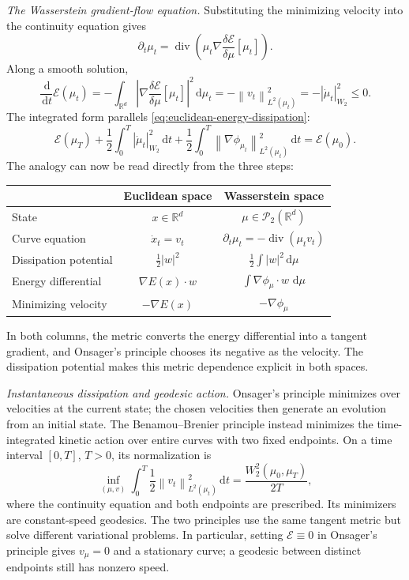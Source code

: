 \documentclass[11pt]{amsart}
\numberwithin{equation}{section}
\theoremstyle{plain}
\newcommand{\R}{\mathbb{R}}
\newcommand{\cP}{\mathcal{P}}
\newcommand{\dd}{\,\mathrm{d}}
\newcommand{\abs}[1]{\left\lvert#1\right\rvert}
\newcommand{\norm}[1]{\left\lVert#1\right\rVert}
\DeclareMathOperator{\diver}{div}
\begin{document}
\emph{The Wasserstein gradient-flow equation.}
Substituting the minimizing velocity into the continuity equation gives
\begin{equation}\label{eq:kinetic-role-gradient-flow}
 \partial_t\mu_t
 =\diver\left(
   \mu_t\nabla\frac{\delta\mathcal E}{\delta\mu}[\mu_t]\right).
\end{equation}
Along a smooth solution,
\begin{equation}\label{eq:wasserstein-energy-dissipation}
 \frac{\dd}{\dd t}\mathcal E(\mu_t)
 =-\int_{\R^d}
   \left|\nabla\frac{\delta\mathcal E}{\delta\mu}[\mu_t]\right|^2
   \dd\mu_t
 =-\norm{v_t}_{L^2(\mu_t)}^2
 =-\abs{\dot\mu_t}_{W_2}^2\leq0.
\end{equation}
The integrated form parallels \eqref{eq:euclidean-energy-dissipation}:
\begin{equation}\label{eq:wasserstein-integrated-dissipation}
 \mathcal E(\mu_T)
 +\frac12\int_0^T\abs{\dot\mu_t}_{W_2}^2\dd t
 +\frac12\int_0^T\norm{\nabla\phi_{\mu_t}}_{L^2(\mu_t)}^2\dd t
 =\mathcal E(\mu_0).
\end{equation}
The analogy can now be read directly from the three steps:
\begin{center}
\renewcommand{\arraystretch}{1.5}
\begin{tabular}{lcc}
 \hline
 & Euclidean space & Wasserstein space \\
 \hline
 State & $x\in\R^d$ & $\mu\in\cP_2(\R^d)$ \\
 Curve equation & $\dot x_t=v_t$
   & $\partial_t\mu_t=-\diver(\mu_t v_t)$ \\
 Dissipation potential & $\frac12\abs w^2$
   & $\frac12\int\abs w^2\dd\mu$ \\
 Energy differential & $\nabla E(x)\cdot w$
   & $\int\nabla\phi_\mu\cdot w\,\dd\mu$ \\
 Minimizing velocity & $-\nabla E(x)$ & $-\nabla\phi_\mu$ \\
 \hline
\end{tabular}
\end{center}
In both columns, the metric converts the energy differential into a tangent
gradient, and Onsager's principle chooses its negative as the velocity.
The dissipation potential makes this metric dependence explicit in both
spaces.

\emph{Instantaneous dissipation and geodesic action.}
Onsager's principle minimizes over velocities at the current state; the
chosen velocities then generate an evolution from an initial state.  The
Benamou--Brenier principle instead minimizes the time-integrated kinetic
action over entire curves with two fixed endpoints.  On a time interval
$[0,T]$, $T>0$, its normalization is
\[
 \inf_{(\mu,v)}\int_0^T\frac12\norm{v_t}_{L^2(\mu_t)}^2\dd t
 =\frac{W_2^2(\mu_0,\mu_T)}{2T},
\]
where the continuity equation and both endpoints are prescribed.  Its
minimizers are constant-speed geodesics.  The two principles use the same
tangent metric but solve different variational problems.  In particular,
setting $\mathcal E\equiv0$ in Onsager's principle gives $v_\mu=0$ and a
stationary curve; a geodesic between distinct endpoints still has nonzero
speed.
\end{document}
